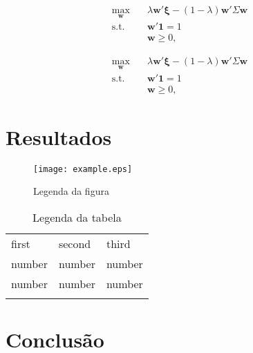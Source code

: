 \documentclass[11pt,a4paper,twoside,openright]{book}
\begin{document}
\begin{sloppy}
\begin{align}
    \max_{\bm{w}} \quad & \lambda\bm{w'\xi} - (1-\lambda)\bm{w'}\Sigma \bm{w}  \label{eq:meanvariance1}\\
    \text{s.t.} \quad & \bm{w'1} = 1 \nonumber\\
    & \bm{w} \geq 0,
\end{align}

\begin{align*}
    \max_{\bm{w}} \quad & \lambda\bm{w'\xi} - (1-\lambda)\bm{w'}\Sigma \bm{w} \label{eq:meanvariance2}\\
    \text{s.t.} \quad & \bm{w'1} = 1\\
    & \bm{w} \geq 0,
\end{align*}






%
%
\chapter{Resultados \label{ch:resultados}}

\begin{figure}[ht!]
\centering
\texttt{[image: example.eps]}
\caption{Legenda da figura}
\label{fig:1}       %
\end{figure}

\begin{table}[ht!]
\centering
\caption{Legenda da tabela}
\label{tab:1}       %
\begin{tabular}{lll}
\hline\noalign{\smallskip}
first & second & third  \\
\noalign{\smallskip}\hline\noalign{\smallskip}
number & number & number \\
number & number & number \\
\noalign{\smallskip}\hline
\end{tabular}
\end{table}

%
%
\chapter{Conclusão \label{ch:conclusao}}



%
% 
%
\printbibliography

\end{sloppy}
\end{document}
